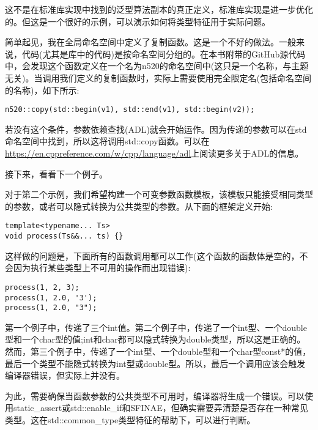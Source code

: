 这不是在标准库实现中找到的泛型算法副本的真正定义，标准库实现是进一步优化的。但这是一个很好的示例，可以演示如何将类型特征用于实际问题。

简单起见，我在全局命名空间中定义了复制函数。这是一个不好的做法。一般来说，代码(尤其是库中的代码)是按命名空间分组的。在本书附带的GitHub源代码中，会发现这个函数定义在一个名为n520的命名空间中(这只是一个名称，与主题无关)。当调用我们定义的复制函数时，实际上需要使用完全限定名(包括命名空间的名称)，如下所示:

\begin{lstlisting}[style=styleCXX]
n520::copy(std::begin(v1), std::end(v1), std::begin(v2));
\end{lstlisting}

若没有这个条件，参数依赖查找(ADL)就会开始运作。因为传递的参数可以在std命名空间中找到，所以这将调用std::copy函数。可以在\url{https://en.cppreference.com/w/cpp/language/adl}上阅读更多关于ADL的信息。

接下来，看看下一个例子。


对于第二个示例，我们希望构建一个可变参数函数模板，该模板只能接受相同类型的参数，或者可以隐式转换为公共类型的参数。从下面的框架定义开始:

\begin{lstlisting}[style=styleCXX]
template<typename... Ts>
void process(Ts&&... ts) {}
\end{lstlisting}

这样做的问题是，下面所有的函数调用都可以工作(这个函数的函数体是空的，不会因为执行某些类型上不可用的操作而出现错误):

\begin{lstlisting}[style=styleCXX]
process(1, 2, 3);
process(1, 2.0, '3');
process(1, 2.0, "3");
\end{lstlisting}

第一个例子中，传递了三个int值。第二个例子中，传递了一个int型、一个double型和一个char型的值;int和char都可以隐式转换为double类型，所以这是正确的。然而，第三个例子中，传递了一个int型、一个double型和一个char型const*的值，最后一个类型不能隐式转换为int型或double型。所以，最后一个调用应该会触发编译器错误，但实际上并没有。

为此，需要确保当函数参数的公共类型不可用时，编译器将生成一个错误。可以使用static\_assert或std::enable\_if和SFINAE，但确实需要弄清楚是否存在一种常见类型。这在std::common\_type类型特征的帮助下，可以进行判断。

